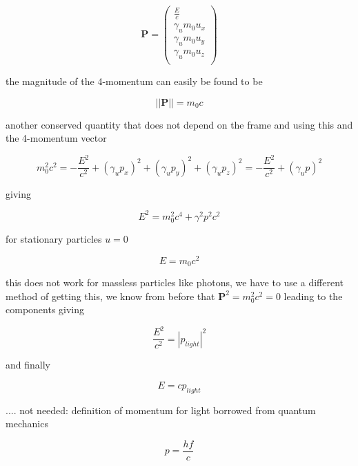 \begin{equation}
	\mathbf{P} =
	\begin{pmatrix}
		\frac{E}{c}      \\
		\gamma_u m_0 u_x \\
		\gamma_u m_0 u_y \\
		\gamma_u m_0 u_z \\
	\end{pmatrix}
\end{equation}

the magnitude of the 4-momentum can easily be found to be

\begin{equation}
	||\mathbf{P}|| = m_0 c
\end{equation}

another conserved quantity that does not depend on the frame and using this and the 4-momentum vector

\begin{equation}
	m^2_0 c^2 = - \frac{E^2}{c^2}  + (\gamma_u p_x)^2 + (\gamma_u p_y)^2 + (\gamma_u p_z)^2 = - \frac{E^2}{c^2}  + (\gamma_u p)^2
\end{equation}

giving

\begin{equation}
	E^2 = m_0^2c^4 +\gamma^2p^2c^2
\end{equation}

for stationary particles $u=0$

\begin{equation}
	E = m_0c^2
\end{equation}

this does not work for massless particles like photons, we have to use a different method of getting this, we know from before that $ \mathbf{P}^2 = m_0^2 c^2 = 0$ leading to the components giving

\begin{equation}
	\frac{E^2}{c^2} = |p_{light}|^2
\end{equation}

and finally

\begin{equation}
	E = c p_{light}
\end{equation}

....
not needed:
definition of momentum for light borrowed from quantum mechanics

\begin{equation}
	p = \frac{hf}{c}
\end{equation}


